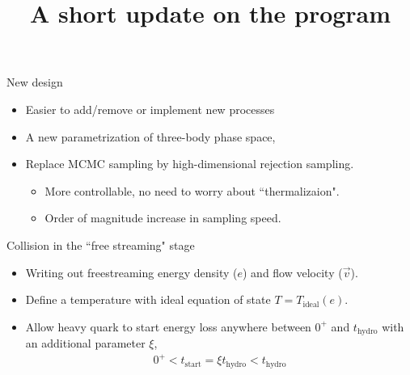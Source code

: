 \documentclass[11pt]{beamer}
\title{A short update on the program}
\begin{document}
\begin{frame}
\titlepage
\end{frame}


\begin{frame}{New design}
\begin{itemize}
\item Easier to add/remove or implement new processes
\item A new parametrization of three-body phase space,
\item Replace MCMC sampling by high-dimensional rejection sampling.
	\begin{itemize}
	\item More controllable, no need to worry about ``thermalizaion".
	\item Order of magnitude increase in sampling speed.
	\end{itemize}
\end{itemize}
\end{frame}

\begin{frame}{Collision in the ``free streaming" stage}
\begin{itemize}
\item Writing out freestreaming energy density ($e$) and flow velocity ($\vec{v}$).
\item Define a temperature with ideal equation of state $T = T_{\textrm{ideal}}(e)$.
\item Allow heavy quark to start energy loss anywhere between $0^+$ and $t_{\textrm{hydro}}$ with an additional parameter $\xi$, 
\begin{eqnarray}
0^+< t_{\textrm{start}} = \xi t_{\textrm{hydro}} < t_{\textrm{hydro}}
\end{eqnarray}
\end{itemize}
\end{frame}
\end{document}
